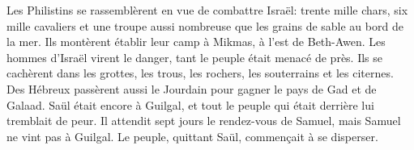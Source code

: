 Les Philistins se rassemblèrent en vue de combattre Israël:
	trente mille chars, six mille cavaliers
	et une troupe aussi nombreuse que les grains de sable au bord de la mer.
Ils montèrent établir leur camp à Mikmas, à l’est de Beth-Awen.
Les hommes d’Israël virent le danger, tant le peuple était menacé de près.
Ils se cachèrent dans les grottes, les trous, les rochers,
	les souterrains et les citernes.
Des Hébreux passèrent aussi le Jourdain pour gagner le pays de Gad et de Galaad.
Saül était encore à Guilgal,
	et tout le peuple qui était derrière lui tremblait de peur.
Il attendit sept jours le rendez-vous de Samuel,
	mais Samuel ne vint pas à Guilgal.
	Le peuple, quittant Saül, commençait à se disperser.
